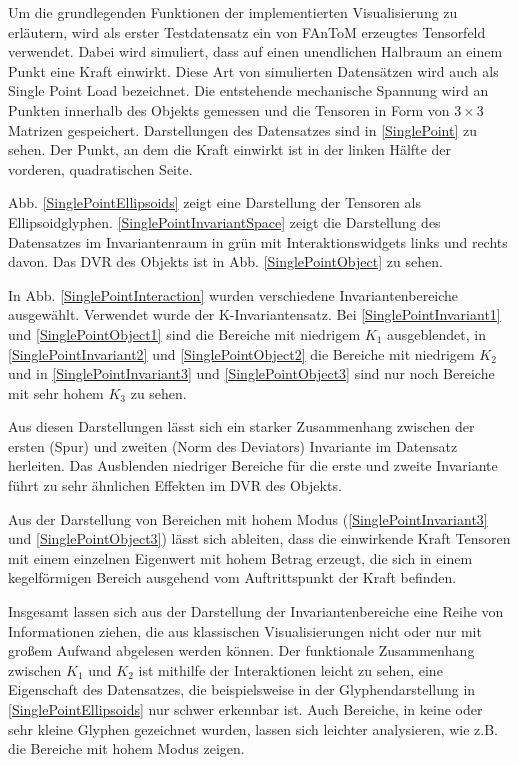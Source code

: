 \documentclass[a4paper,fontsize=12pt,toc=bib,halfparskip]{scrartcl}
\begin{document}
Um die grundlegenden Funktionen der implementierten Visualisierung zu erl\"autern, wird als erster Testdatensatz ein von FAnToM erzeugtes Tensorfeld verwendet. Dabei wird simuliert, dass auf einen unendlichen Halbraum an einem Punkt eine Kraft einwirkt. Diese Art von simulierten Datens\"atzen wird auch als Single Point Load bezeichnet. Die entstehende mechanische Spannung wird an Punkten innerhalb des Objekts gemessen und die Tensoren in Form von $3\times3$ Matrizen gespeichert. Darstellungen des Datensatzes sind in \ref{SinglePoint} zu sehen. Der Punkt, an dem die Kraft einwirkt ist in der linken H\"alfte der vorderen, quadratischen Seite. 

Abb. \ref{SinglePointEllipsoids} zeigt eine Darstellung der Tensoren als Ellipsoidglyphen. \ref{SinglePointInvariantSpace} zeigt die Darstellung des Datensatzes im Invariantenraum in gr\"un mit Interaktionswidgets links und rechts davon. Das DVR des Objekts ist in Abb. \ref{SinglePointObject} zu sehen.

In Abb. \ref{SinglePointInteraction} wurden verschiedene Invariantenbereiche ausgew\"ahlt. Verwendet wurde der K-Invariantensatz. Bei \ref{SinglePointInvariant1} und \ref{SinglePointObject1} sind die Bereiche mit niedrigem $K_1$ ausgeblendet, in \ref{SinglePointInvariant2} und \ref{SinglePointObject2} die Bereiche mit niedrigem $K_2$ und in \ref{SinglePointInvariant3} und \ref{SinglePointObject3} sind nur noch Bereiche mit sehr hohem $K_3$ zu sehen. 

Aus diesen Darstellungen l\"asst sich ein starker Zusammenhang zwischen der ersten (Spur) und zweiten (Norm des Deviators) Invariante im Datensatz herleiten. Das Ausblenden niedriger Bereiche f\"ur die erste und zweite Invariante f\"uhrt zu sehr \"ahnlichen Effekten im DVR des Objekts.  

Aus der Darstellung von Bereichen mit hohem Modus (\ref{SinglePointInvariant3} und \ref{SinglePointObject3}) l\"asst sich ableiten, dass die einwirkende Kraft Tensoren mit einem einzelnen Eigenwert mit hohem Betrag erzeugt, die sich in einem kegelf\"ormigen Bereich ausgehend vom Auftrittspunkt der Kraft befinden.

Insgesamt lassen sich aus der Darstellung der Invariantenbereiche eine Reihe von Informationen ziehen, die aus klassischen Visualisierungen nicht oder nur mit gro{\ss}em Aufwand abgelesen werden k\"onnen. Der funktionale Zusammenhang zwischen $K_1$ und $K_2$ ist mithilfe der Interaktionen leicht zu sehen, eine Eigenschaft des Datensatzes, die beispielsweise in der Glyphendarstellung in \ref{SinglePointEllipsoids} nur schwer erkennbar ist. Auch Bereiche, in keine oder sehr kleine Glyphen gezeichnet wurden, lassen sich leichter analysieren, wie z.B. die Bereiche mit hohem Modus zeigen. 
\end{document}
